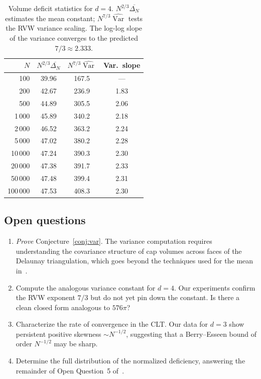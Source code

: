 \documentclass[11pt]{article}
\begin{document}
\begin{table}[t]
\centering
\caption{Volume deficit statistics for $d = 4$.
$N^{2/3}\overline{\Delta_N}$ estimates the mean constant;
$N^{7/3}\widehat{\operatorname{Var}}$ tests the RVW variance
scaling.  The log-log slope of the variance converges to the
predicted $7/3 \approx 2.333$.}
\label{tab:data4d}
\smallskip
\begin{tabular}{@{}rccc@{}}
\toprule
$N$ & $N^{2/3}\overline{\Delta_N}$ & $N^{7/3}\widehat{\operatorname{Var}}$ & Var.\ slope \\
\midrule
100     & 39.96 &  167.5 & --- \\
200     & 42.67 &  236.9 & 1.83 \\
500     & 44.89 &  305.5 & 2.06 \\
1\,000  & 45.89 &  340.2 & 2.18 \\
2\,000  & 46.52 &  363.2 & 2.24 \\
5\,000  & 47.02 &  380.2 & 2.28 \\
10\,000 & 47.24 &  390.3 & 2.30 \\
20\,000 & 47.38 &  391.7 & 2.33 \\
50\,000 & 47.48 &  399.4 & 2.31 \\
100\,000& 47.53 &  408.3 & 2.30 \\
\bottomrule
\end{tabular}
\end{table}

\subsection{Open questions}

\begin{enumerate}
  \item \emph{Prove} Conjecture~\ref{conj:var}.  The variance
    computation requires understanding the covariance structure
    of cap volumes across faces of the Delaunay triangulation,
    which goes beyond the techniques used for the mean
    in~\cite{AEN2021}.
  \item Compute the analogous variance constant for $d = 4$.
    Our experiments confirm the RVW exponent $7/3$ but do not
    yet pin down the constant.  Is there a clean closed form
    analogous to $576\pi$?
  \item Characterize the rate of convergence in the CLT.  Our
    data for $d = 3$ show persistent positive skewness
    $\sim N^{-1/2}$, suggesting that a Berry--Esseen bound
    of order $N^{-1/2}$ may be sharp.
  \item Determine the full distribution of the normalized
    deficiency, answering the remainder of Open Question~5
    of~\cite{AEN2021}.
\end{enumerate}
\end{document}

